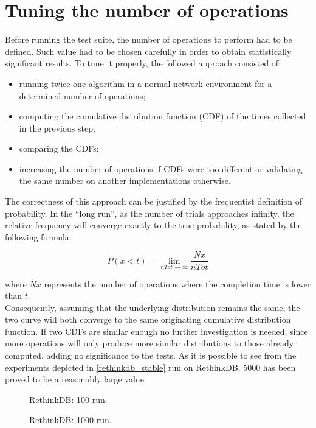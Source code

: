 \section{Tuning the number of operations}
Before running the test suite, the number of operations to perform had to be defined. Such value had to be chosen carefully in order to obtain statistically significant results. To tune it properly, the followed approach consisted of:

\begin{itemize}
    \item running twice one algorithm in a normal network environment for a determined number of operations;
    \item computing the cumulative distribution function (CDF) of the times collected in the previous step;
    \item comparing the CDFs;
    \item increasing the number of operations if CDFs were too different or validating the same number on another implementations otherwise.
\end{itemize}

The correctness of this approach can be justified by the frequentist definition of probability.
In the \enquote{long run}, as the number of trials approaches infinity, the relative frequency will converge exactly to the true probability, as stated by the following formula:

\[ 
P(x < t) = \lim_{nTot\to\infty} \frac{Nx}{nTot}
\]

where \(Nx\) represents the number of operations where the completion time is lower than \(t\).\\
Consequently, assuming that the underlying distribution remains the same, the two curve will both converge to the same originating cumulative distribution function. If two CDFs are similar enough no further investigation is needed, since more operations will only produce more similar distributions to those already computed, adding no significance to the tests. As it is possible to see from the experiments depicted in \ref{rethinkdb_stable} run on RethinkDB, 5000 has been proved to be a reasonably large value. 

\begin{figure}[H]
  \caption{RethinkDB: 100 run.}
\end{figure}

\begin{figure}[H]
  \caption{RethinkDB: 1000 run.}
\end{figure}

